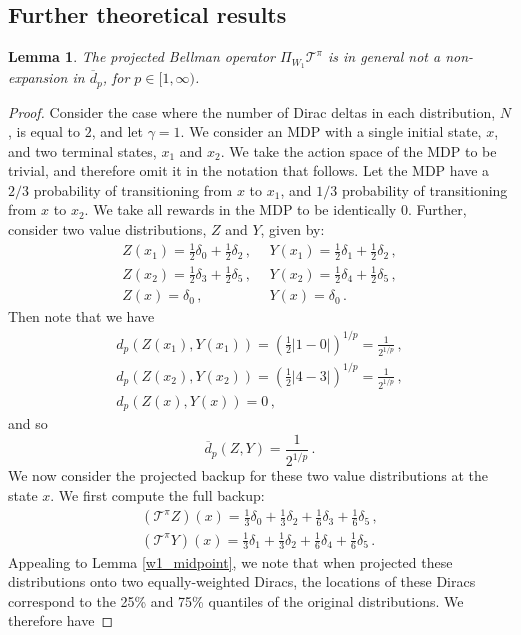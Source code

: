 \documentclass[letterpaper]{article}
\newtheorem{lem}{Lemma}
\begin{document}
\subsection{Further theoretical results}

\begin{lem}\label{lem:dpnocontraction}
The projected Bellman operator $\Pi_{W_1}\mathcal{T}^\pi$ is in general not a non-expansion in $\overline{d}_p$, for $p \in [1, \infty)$.
\end{lem}
\begin{proof}
Consider the case where the number of Dirac deltas in each distribution, $N$, is equal to $2$, and let $\gamma=1$. We consider an MDP with a single initial state, $x$, and two terminal states, $x_1$ and $x_2$. We take the action space of the MDP to be trivial, and therefore omit it in the notation that follows. Let the MDP have a $2/3$ probability of transitioning from $x$ to $x_1$, and $1/3$ probability of transitioning from $x$ to $x_2$. We take all rewards in the MDP to be identically $0$. Further, consider two value distributions, $Z$ and $Y$, given by:
\begin{align*}
Z(x_1) = \frac{1}{2}\delta_0 + \frac{1}{2} \delta_2 \, , &\ \ Y(x_1) = \frac{1}{2}\delta_1 + \frac{1}{2} \delta_2 \, , \\
Z(x_2) = \frac{1}{2}\delta_3 + \frac{1}{2} \delta_5 \, , &\ \ Y(x_2) = \frac{1}{2}\delta_4 + \frac{1}{2} \delta_5 \, , \\
Z(x) = \delta_0 \, ,& \ \ Y(x) = \delta_0 \, .
\end{align*}
Then note that we have
\begin{align*}
d_p(Z(x_1), Y(x_1)) = \left(\frac{1}{2}|1 - 0|\right)^{1/p} = \frac{1}{2^{1/p}} \, , \\
d_p(Z(x_2), Y(x_2)) = \left(\frac{1}{2}|4 - 3|\right)^{1/p} = \frac{1}{2^{1/p}} \, , \\
d_p(Z(x), Y(x)) = 0 \, ,
\end{align*}
and so
\[
\overline{d}_p(Z, Y) = \frac{1}{2^{1/p}} \, .
\]
We now consider the projected backup for these two value distributions at the state $x$. We first compute the full backup:
\begin{align*}
    (\mathcal{T}^\pi Z)(x) = \frac{1}{3} \delta_0 + \frac{1}{3} \delta_2 + \frac{1}{6} \delta_3 + \frac{1}{6} \delta_5 \, ,\\
    (\mathcal{T}^\pi Y)(x) = \frac{1}{3} \delta_1 + \frac{1}{3} \delta_2 + \frac{1}{6} \delta_4 + \frac{1}{6} \delta_5 \, .
\end{align*}
Appealing to Lemma \ref{w1_midpoint}, we note that when projected these distributions onto two equally-weighted Diracs, the locations of these Diracs correspond to the 25\% and 75\% quantiles of the original distributions. We therefore have

\end{proof}
\end{document}
